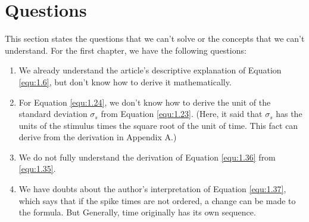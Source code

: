 
\section{Questions}
This section states the questions that we can't solve or the concepts that we can't understand.
\label{sec:questions}
For the first chapter, we have the following questions:
\begin{enumerate}
\item We already understand the article's descriptive explanation of
Equation \ref{equ:1.6}, but don't know how to derive it
mathematically.
\item For Equation \ref{equ:1.24}, we don't know how to derive the unit of the standard deviation $\sigma_s$ from Equation \ref{equ:1.23}. (Here, it said that $\sigma_s$ has the units of the stimulus times the square root of the unit of time. This fact can derive from the derivation in Appendix A.)
\item We do not fully understand the derivation of Equation \ref{equ:1.36} from \ref{equ:1.35}.
\item We have doubts about the author's interpretation of Equation
\ref{equ:1.37}, which says that if the spike times are not ordered, a
change can be made to the formula. But Generally, time
originally has its own sequence.
\end{enumerate}











